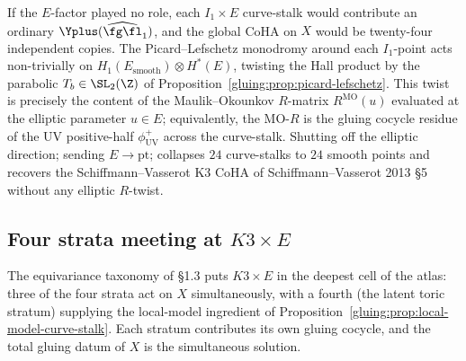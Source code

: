 \begin{remark}
\label{gluing:rem:elliptic-tensor-non-trivial}
If the $E$-factor played no role, each $I_1 \times E$ curve-stalk
would contribute an ordinary $\Yplus(\widehat{\fg\fl}_1)$, and the
global CoHA on $X$ would be twenty-four independent copies. The
Picard--Lefschetz monodromy around each $I_1$-point acts non-trivially
on $H_1(E_{\text{smooth}}) \otimes H^*(E)$, twisting the Hall product
by the parabolic $T_b \in \SL_2(\Z)$ of
Proposition~\ref{gluing:prop:picard-lefschetz}. This twist is precisely the
content of the Maulik--Okounkov $R$-matrix $R^{\mathrm{MO}}(u)$
evaluated at the elliptic parameter $u \in E$; equivalently, the
MO-$R$ is the gluing cocycle residue of the UV positive-half
$\phi^+_{\mathrm{UV}}$ across the curve-stalk. Shutting off the elliptic direction; sending $E \to
\mathrm{pt}$; collapses $24$ curve-stalks to $24$ smooth points
and recovers the Schiffmann--Vasserot K3 CoHA of
Schiffmann--Vasserot 2013 \S 5 without any elliptic $R$-twist.
\end{remark}

\subsection{Four strata meeting at $K3 \times E$}
\label{gluing:sec:k3xe-four-stratum}

The equivariance taxonomy of \S 1.3 puts $K3 \times E$ in the deepest
cell of the atlas: three of the four strata act on $X$
simultaneously, with a fourth (the latent toric stratum) supplying
the local-model ingredient of
Proposition~\ref{gluing:prop:local-model-curve-stalk}. Each stratum contributes
its own gluing cocycle, and the total gluing datum of $X$ is the
simultaneous solution.

